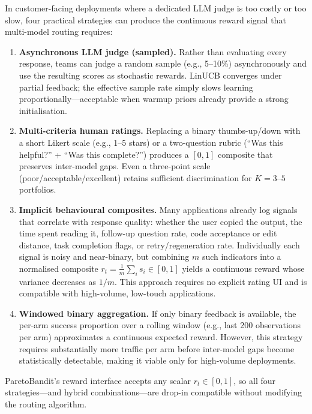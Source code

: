 In customer-facing deployments where a dedicated LLM judge is too costly or too slow, four practical strategies can produce the continuous reward signal that multi-model routing requires:
\begin{enumerate}[nosep,leftmargin=*]
  \item \textbf{Asynchronous LLM judge (sampled).}  Rather than evaluating every response, teams can judge a random sample (e.g., 5--10\%) asynchronously and use the resulting scores as stochastic rewards.  LinUCB converges under partial feedback; the effective sample rate simply slows learning proportionally---acceptable when warmup priors already provide a strong initialisation.
  \item \textbf{Multi-criteria human ratings.}  Replacing a binary thumbs-up/down with a short Likert scale (e.g., 1--5 stars) or a two-question rubric (``Was this helpful?'' + ``Was this complete?'') produces a $[0,1]$ composite that preserves inter-model gaps.  Even a three-point scale (poor/acceptable/excellent) retains sufficient discrimination for $K{=}3$--$5$ portfolios.
  \item \textbf{Implicit behavioural composites.}  Many applications already log signals that correlate with response quality: whether the user copied the output, the time spent reading it, follow-up question rate, code acceptance or edit distance, task completion flags, or retry/regeneration rate.  Individually each signal is noisy and near-binary, but combining $m$ such indicators into a normalised composite $r_t = \frac{1}{m}\sum_i s_i \in [0,1]$ yields a continuous reward whose variance decreases as $1/m$.  This approach requires no explicit rating UI and is compatible with high-volume, low-touch applications.
  \item \textbf{Windowed binary aggregation.}  If only binary feedback is available, the per-arm success proportion over a rolling window (e.g., last 200 observations per arm) approximates a continuous expected reward.  However, this strategy requires substantially more traffic per arm before inter-model gaps become statistically detectable, making it viable only for high-volume deployments.
\end{enumerate}
ParetoBandit's reward interface accepts any scalar $r_t \in [0,1]$, so all four strategies---and hybrid combinations---are drop-in compatible without modifying the routing algorithm.

